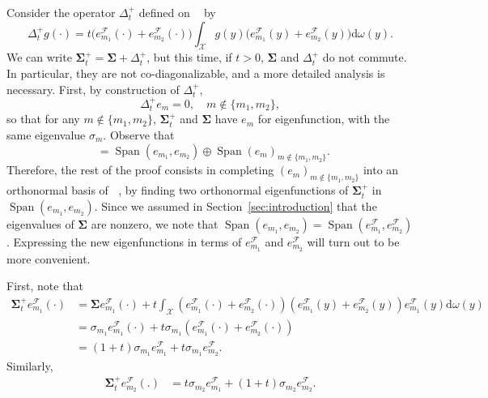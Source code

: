 \documentclass[twoside,11pt]{book}
\numberwithin{theorem}{chapter}
\numberwithin{definition}{chapter}
\numberwithin{proposition}{chapter}
\numberwithin{corollary}{chapter}
\numberwithin{example}{chapter}
\numberwithin{lemma}{chapter}
\DeclareMathOperator{\Span}{\mathrm{Span}}
\DeclareMathOperator{\F}{\mathcal{F}}
\DeclareMathOperator{\X}{\mathcal{X}}
\DeclareMathOperator{\Ltwo}{\mathbb{L}_{2}(\mathrm{d} \omega)}
\begin{document}
Consider the operator $\Delta_{t}^{+}$ defined on $\Ltwo$ by
\begin{equation}
\Delta_{t}^{+}g(\cdot) = t \bigg(e_{m_{1}}^{\F}(\cdot)+e_{m_{2}}^{\F}(\cdot) \bigg) \int_{\X} g(y) \bigg(e_{m_{1}}^{\F}(y)+e_{m_{2}}^{\F}(y) \bigg) \mathrm{d}\omega(y).
\end{equation}
We can write $\bm{\Sigma}_{t}^{+} = \bm{\Sigma} + \Delta_{t}^{+}$, but this time, if $t>0$, $\bm{\Sigma}$ and $\Delta_{t}^{+}$ do not commute. In particular, they are not co-diagonalizable, and a more detailed analysis is necessary. First, by construction of $\Delta_{t}^{+}$,
$$
\Delta_{t}^{+} e_m = 0, \quad m\notin\{m_1,m_2\},
$$
so that for any $m\notin\{m_1,m_2\}$, $\bm{\Sigma}_{t}^{+}$ and $\bm{\Sigma}$ have $e_m$ for eigenfunction, with the same eigenvalue $\sigma_m$. Observe that
\begin{equation}
\Ltwo = \Span (e_{m_1},e_{m_2}) \oplus \Span (e_{m})_{m \notin \{m_1,m_2\}}.
\end{equation}
Therefore, the rest of the proof consists in completing $(e_m)_{m\notin\{m_1,m_2\}}$ into an orthonormal basis of $\Ltwo$, by finding two orthonormal eigenfunctions of $\bm{\Sigma}_{t}^{+}$ in $\Span (e_{m_{1}},e_{m_{2}})$.
Since we assumed in Section~\ref{sec:introduction} that the eigenvalues of $\bm{\Sigma}$ are nonzero, we note that $\Span (e_{m_{1}},e_{m_{2}}) = \Span (e_{m_{1}}^{\F},e_{m_{2}}^{\F})$. Expressing the new eigenfunctions in terms of $e_{m_{1}}^{\F}$ and $e_{m_{2}}^{\F}$ will turn out to be more convenient.

First, note that 
\begin{align}
\bm{\Sigma}_{t}^{+}e_{m_{1}}^{\mathcal{F}}(\cdot) & = \bm{\Sigma} e_{m_{1}}^{\mathcal{F}}(\cdot) + t \int_{\mathcal{X}} \left(e_{m_{1}}^{\mathcal{F}}(\cdot) + e_{m_{2}}^{\mathcal{F}}(\cdot) \right)\left( e_{m_{1}}^{\mathcal{F}}(y) + e_{m_{2}}^{\mathcal{F}}(y) \right) e_{m_{1}}^{\mathcal{F}}(y) \mathrm{d}\omega(y) \\
& = \sigma_{m_{1}} e_{m_{1}}^{\mathcal{F}}(\cdot) + t \sigma_{m_{1}} \left(e_{m_{1}}^{\mathcal{F}}(\cdot) + e_{m_{2}}^{\mathcal{F}}(\cdot) \right)\\
& = (1+t) \sigma_{m_{1}}e_{m_{1}}^{\mathcal{F}} + t \sigma_{m_{1}} e_{m_{2}}^{\mathcal{F}}.\label{eq:sigma_t_plus_action}
\end{align}
Similarly,
\begin{align}
\bm{\Sigma}_{t}^{+}e_{m_{2}}^{\mathcal{F}}(.) & = t \sigma_{m_{2}} e_{m_{1}}^{\mathcal{F}} + (1+t) \sigma_{m_{2}}e_{m_{2}}^{\mathcal{F}}.\label{eq:sigma_t_plus_action_2}
\end{align}
\end{document}
